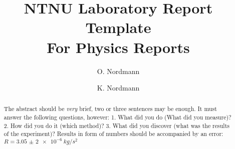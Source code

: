 \begin{frontmatter}
%
\title{%
NTNU Laboratory Report Template\\
\small For Physics Reports  %
}
%
\author[NTNUphysics]{O. Nordmann} 
\author[NTNUphysics]{K. Nordmann}
\address[NTNUphysics]{Institutt for fysikk, Norges Teknisk-Naturvitenskaplege Universitet, N-7491 Trondheim, Norway.}
%
%
\renewcommand*{\today}{\MonthYearDateFormat\displaydate{dateName}} 
%
\begin{abstract}

The abstract should be \textit{very} brief, two or three sentences may be enough. It must answer the following questions, however:
1. What did you do (What did you measure)?
2. How did you do it (which method)?
3. What did you discover (what was the results of the experiment)?
Results in form of numbers should be accompanied by an error: $R=\SI{3,05(2)e-6}{kg/s^{2}}$

\end{abstract}
%
\end{frontmatter}
%
%
%

